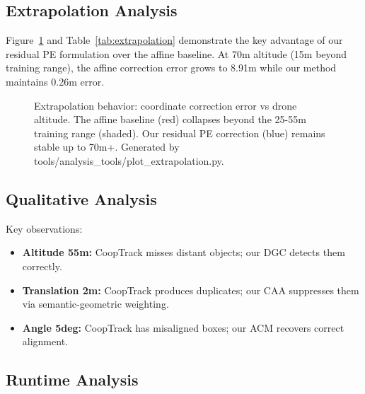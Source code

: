 \documentclass[9.5pt,twocolumn,a4paper]{IEEEtran}
\begin{document}
\subsection{Extrapolation Analysis}

Figure~\ref{fig:extrapolation} and Table~\ref{tab:extrapolation} demonstrate the key advantage of our residual PE formulation over the affine baseline. At 70m altitude (15m beyond training range), the affine correction error grows to 8.91m while our method maintains 0.26m error.

\begin{figure}[htbp]
    \centering
    \caption{Extrapolation behavior: coordinate correction error vs drone altitude. The affine baseline (red) collapses beyond the 25-55m training range (shaded). Our residual PE correction (blue) remains stable up to 70m+. Generated by tools/analysis\_tools/plot\_extrapolation.py.}
    \label{fig:extrapolation}
\end{figure}

\subsection{Qualitative Analysis}


Key observations:
\begin{itemize}
    \item \textbf{Altitude 55m:} CoopTrack misses distant objects; our DGC detects them correctly.
    \item \textbf{Translation 2m:} CoopTrack produces duplicates; our CAA suppresses them via semantic-geometric weighting.
    \item \textbf{Angle 5deg:} CoopTrack has misaligned boxes; our ACM recovers correct alignment.
\end{itemize}

\subsection{Runtime Analysis}
\end{document}
